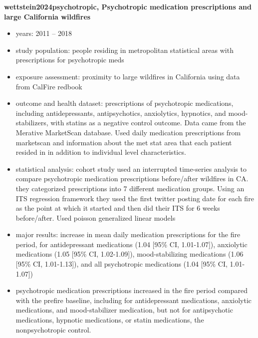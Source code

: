 \textbf{wettstein2024psychotropic, Psychotropic medication prescriptions and large California wildfires}
\begin{itemize}
    \item years: 2011 -- 2018
    \item study population: people residing in metropolitan statistical areas with prescriptions for psychotropic meds
    \item exposure assessment: proximity to large wildfires in California using data from CalFire redbook
    \item outcome and health dataset: prescriptions of psychotropic medications, including antidepressants, antipsychotics, anxiolytics, hypnotics, and mood-stabilizers, with statins as a negative control outcome. Data came from the Merative MarketScan database. Used daily medication prescriptions from marketscan and information about the met stat area that each patient resided in in addition to individual level characteristics. 
    \item statistical analysis: cohort study used an interrupted time-series analysis to compare psychotropic medication prescriptions before/after wildfires in CA. they categorized prescriptions into 7 different medication groups.  Using an ITS regression framework they used the first twitter posting date for each fire as the point at which it started and then did their ITS for 6 weeks before/after. Used poisson generalized linear models 
    \item major results: increase in mean daily medication prescriptions for the fire period, for antidepressant medications (1.04 [95\% CI, 1.01-1.07]), anxiolytic medications (1.05 [95\% CI, 1.02-1.09]), mood-stabilizing medications (1.06 [95\% CI, 1.01-1.13]), and all psychotropic medications (1.04 [95\% CI, 1.01-1.07])
    \item psychotropic medication prescriptions increased in the fire period compared with the prefire baseline, including for antidepressant medications, anxiolytic medications, and mood-stabilizer medication, but not for antipsychotic medications, hypnotic medications, or statin medications, the nonpsychotropic control.
\end{itemize}

